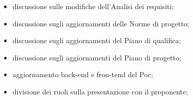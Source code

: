 \begin{itemize}
   \item discussione sulle modifiche dell'Analisi dei requisiti;
   \item discussione sugli aggiornamenti delle Norme di progetto;
   \item discussione sugli aggiornamenti del Piano di qualifica;
   \item discussione sugli aggiornamenti del Piano di progetto;
   \item aggiornamento back-end e fron-tend del Poc;
   \item divisione dei ruoli sulla presentazione con il proponente;
\end{itemize}
